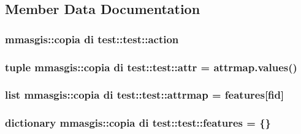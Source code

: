\subsection{Member Data Documentation}
\hypertarget{classmmasgis_1_1copia_01di_01test_1_1test_a6846983849774a0e135f39a29c01314c}{
\subsubsection[{action}]{\setlength{\rightskip}{0pt plus 5cm}mmasgis::copia di test::test::action}}
\label{classmmasgis_1_1copia_01di_01test_1_1test_a6846983849774a0e135f39a29c01314c}
\hypertarget{classmmasgis_1_1copia_01di_01test_1_1test_aec3a224687d170759ec9b31e80eea6bb}{
\subsubsection[{attr}]{\setlength{\rightskip}{0pt plus 5cm}tuple mmasgis::copia di test::test::attr = attrmap.values()}}
\label{classmmasgis_1_1copia_01di_01test_1_1test_aec3a224687d170759ec9b31e80eea6bb}
\hypertarget{classmmasgis_1_1copia_01di_01test_1_1test_a224cbbd45b8c6d9b60779c5be20d9e77}{
\subsubsection[{attrmap}]{\setlength{\rightskip}{0pt plus 5cm}list mmasgis::copia di test::test::attrmap = {\bf features}\mbox{[}fid\mbox{]}}}
\label{classmmasgis_1_1copia_01di_01test_1_1test_a224cbbd45b8c6d9b60779c5be20d9e77}
\hypertarget{classmmasgis_1_1copia_01di_01test_1_1test_a02e44c802a5705da2875d5d732bf1b11}{
\subsubsection[{features}]{\setlength{\rightskip}{0pt plus 5cm}dictionary mmasgis::copia di test::test::features = \{\}}}
